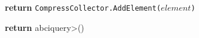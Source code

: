 \begin{figure}[t!]
  \begin{adjustbox}{minipage=[t]{\columnwidth}}
    \begin{algorithm}[H]
      \renewcommand{\thealgorithm}{API Compresschain}         
      \caption{}%
      \label{alg:api-brotli}%
      \small
      \begin{algorithmic}[1]
      
            \label{alg:brotli_add}
                \State \textbf{return} \texttt{CompressCollector.AddElement($element$)}
            \EndFunction
      
            \label{alg:brotli_get}
                	\State \textbf{return} \<abciquery>()
            \EndFunction
            
        \end{algorithmic}
      \end{algorithm}
	\end{adjustbox}
  \end{figure}
